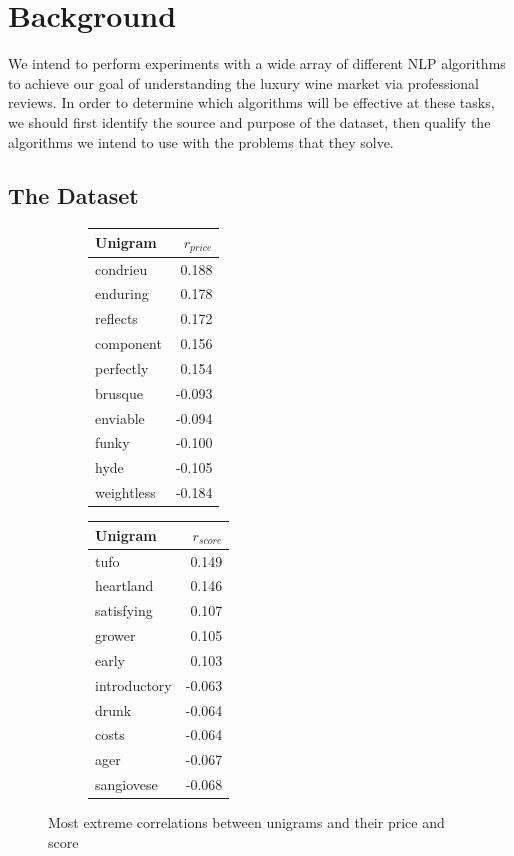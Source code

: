 \documentclass[12pt]{IEEEtran}
\begin{document}
\section{Background}
    We intend to perform experiments with a wide array of different NLP algorithms to achieve our goal of understanding the luxury wine market via professional reviews. In order to determine which algorithms will be effective at these tasks, we should first identify the source and purpose of the dataset, then qualify the algorithms we intend to use with the problems that they solve.

\subsection{The Dataset}

\begin{figure}[b]
    \centering
    \begin{subfigure}{0.4\columnwidth}
    \small
    \begin{tabular}{ |l|r| }
        \hline
        Unigram & $r_{price}$ \\
        \hline
        \hline
        condrieu & 0.188 \\
	    enduring & 0.178 \\ 
	    reflects & 0.172 \\
	    component & 0.156 \\
	    perfectly & 0.154 \\
        \hline
        brusque & -0.093 \\
        enviable & -0.094 \\
        funky & -0.100 \\
        hyde & -0.105 \\
        weightless & -0.184 \\
        \hline
    \end{tabular}
    \end{subfigure}
    \begin{subfigure}{0.4\columnwidth}
    \small
    \begin{tabular}{ |l|r| }
        \hline
        Unigram & $r_{score}$ \\
        \hline
        \hline
        tufo & 0.149 \\
        heartland & 0.146 \\
        satisfying & 0.107 \\
        grower & 0.105 \\
        early & 0.103 \\
        \hline
        introductory & -0.063 \\
        drunk & -0.064 \\
        costs & -0.064 \\
        ager & -0.067 \\
        sangiovese & -0.068 \\
        \hline
    \end{tabular}
    \end{subfigure}
    \caption{Most extreme correlations between unigrams and their price and score}
    \label{correlations}
\end{figure}
\end{document}
